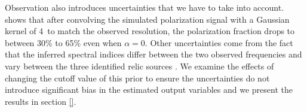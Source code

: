 %
Observation also introduces uncertainties that we have to take into account. \cite{S13} shows that after convolving the
simulated polarization signal with a Gaussian kernel of 4\arcmin~to match
the observed resolution, the polarization fraction drops to between 30\% to
65\% even when $\alpha = 0$. 
Other uncertainties come from the fact that the inferred spectral indices
differ between the two observed frequencies and vary between the three
identified relic sources \citep{L13}. We examine the effects  of changing
the cutoff value of this prior to ensure the uncertainties do not
introduce significant bias in the estimated output variables and we
present the results in section \ref{}. 
%

